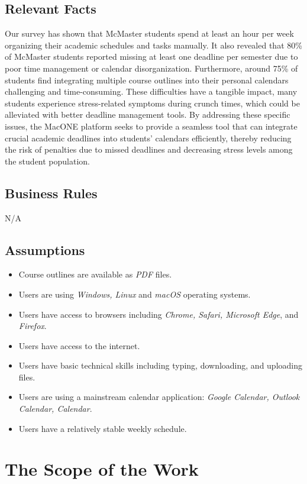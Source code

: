 \documentclass[12pt]{article}
\begin{document}
\subsection{Relevant Facts}
Our survey has shown that McMaster students spend at least an hour per week organizing their academic schedules and tasks manually. It also revealed that 80\% of McMaster students reported missing at least one deadline per semester due to poor time management or calendar disorganization. Furthermore, around 75\% of students find integrating multiple course outlines into their personal calendars challenging and time-consuming. These difficulties have a tangible impact, many students experience stress-related symptoms during crunch times, which could be alleviated with better deadline management tools. By addressing these specific issues, the MacONE platform seeks to provide a seamless tool that can integrate crucial academic deadlines into students' calendars efficiently, thereby reducing the risk of penalties due to missed deadlines and decreasing stress levels among the student population.
\subsection{Business Rules}
N/A
\subsection{Assumptions}
\begin{itemize}
    \item Course outlines are available as \textit{PDF} files.
    \item Users are using \textit{Windows, Linux} and \textit{macOS} operating systems.
    \item Users have access to browsers including \textit{Chrome, Safari, Microsoft Edge}, and \textit{Firefox}.
    \item Users have access to the internet.
    \item Users have basic technical skills including typing, downloading, and uploading files.
    \item Users are using a mainstream calendar application: \textit{Google Calendar, Outlook Calendar, Calendar}.
    \item Users have a relatively stable weekly schedule.
\end{itemize}


\section{The Scope of the Work}
\end{document}
